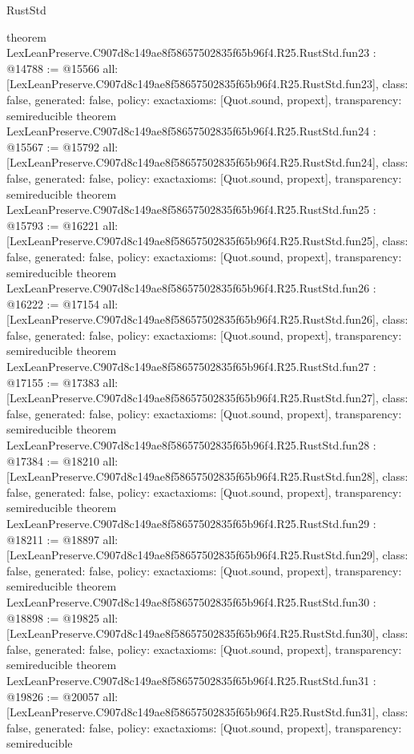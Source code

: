 \begin{lexlean}{RustStd}
\begin{coremodule}
{}
theorem LexLeanPreserve.C907d8c149ae8f58657502835f65b96f4.R25.RustStd.fun23 : @14788 := @15566 {
  all: [LexLeanPreserve.C907d8c149ae8f58657502835f65b96f4.R25.RustStd.fun23],
  class: false,
  generated: false,
  policy: exact{axioms: [Quot.sound, propext]},
  transparency: semireducible
}
theorem LexLeanPreserve.C907d8c149ae8f58657502835f65b96f4.R25.RustStd.fun24 : @15567 := @15792 {
  all: [LexLeanPreserve.C907d8c149ae8f58657502835f65b96f4.R25.RustStd.fun24],
  class: false,
  generated: false,
  policy: exact{axioms: [Quot.sound, propext]},
  transparency: semireducible
}
theorem LexLeanPreserve.C907d8c149ae8f58657502835f65b96f4.R25.RustStd.fun25 : @15793 := @16221 {
  all: [LexLeanPreserve.C907d8c149ae8f58657502835f65b96f4.R25.RustStd.fun25],
  class: false,
  generated: false,
  policy: exact{axioms: [Quot.sound, propext]},
  transparency: semireducible
}
theorem LexLeanPreserve.C907d8c149ae8f58657502835f65b96f4.R25.RustStd.fun26 : @16222 := @17154 {
  all: [LexLeanPreserve.C907d8c149ae8f58657502835f65b96f4.R25.RustStd.fun26],
  class: false,
  generated: false,
  policy: exact{axioms: [Quot.sound, propext]},
  transparency: semireducible
}
theorem LexLeanPreserve.C907d8c149ae8f58657502835f65b96f4.R25.RustStd.fun27 : @17155 := @17383 {
  all: [LexLeanPreserve.C907d8c149ae8f58657502835f65b96f4.R25.RustStd.fun27],
  class: false,
  generated: false,
  policy: exact{axioms: [Quot.sound, propext]},
  transparency: semireducible
}
theorem LexLeanPreserve.C907d8c149ae8f58657502835f65b96f4.R25.RustStd.fun28 : @17384 := @18210 {
  all: [LexLeanPreserve.C907d8c149ae8f58657502835f65b96f4.R25.RustStd.fun28],
  class: false,
  generated: false,
  policy: exact{axioms: [Quot.sound, propext]},
  transparency: semireducible
}
theorem LexLeanPreserve.C907d8c149ae8f58657502835f65b96f4.R25.RustStd.fun29 : @18211 := @18897 {
  all: [LexLeanPreserve.C907d8c149ae8f58657502835f65b96f4.R25.RustStd.fun29],
  class: false,
  generated: false,
  policy: exact{axioms: [Quot.sound, propext]},
  transparency: semireducible
}
theorem LexLeanPreserve.C907d8c149ae8f58657502835f65b96f4.R25.RustStd.fun30 : @18898 := @19825 {
  all: [LexLeanPreserve.C907d8c149ae8f58657502835f65b96f4.R25.RustStd.fun30],
  class: false,
  generated: false,
  policy: exact{axioms: [Quot.sound, propext]},
  transparency: semireducible
}
theorem LexLeanPreserve.C907d8c149ae8f58657502835f65b96f4.R25.RustStd.fun31 : @19826 := @20057 {
  all: [LexLeanPreserve.C907d8c149ae8f58657502835f65b96f4.R25.RustStd.fun31],
  class: false,
  generated: false,
  policy: exact{axioms: [Quot.sound, propext]},
  transparency: semireducible
}
\end{coremodule}
\end{lexlean}
